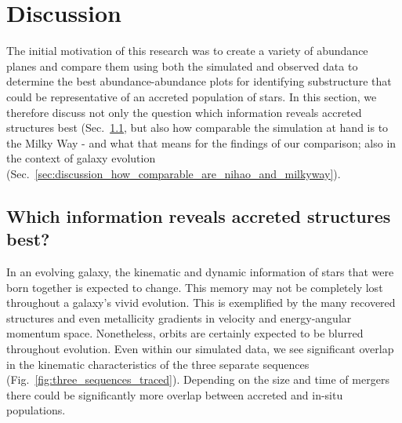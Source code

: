 \documentclass[fleqn,usenatbib]{mnras}
\begin{document}
\section{Discussion} \label{sec:discussion}

The initial motivation of this research was to create a variety of abundance planes and compare them using both the simulated and observed data to determine the best abundance-abundance plots for identifying substructure that could be representative of an accreted population of stars. In this section, we therefore discuss not only the question which information reveals accreted structures best (Sec.~\ref{sec:discussion_best_information}, but also how comparable the simulation at hand is to the Milky Way - and what that means for the findings of our comparison; also in the context of galaxy evolution (Sec.~\ref{sec:discussion_how_comparable_are_nihao_and_milkyway}).

\subsection{Which information reveals accreted structures best?} \label{sec:discussion_best_information}

In an evolving galaxy, the kinematic and dynamic information of stars that were born together is expected to change. This memory may not be completely lost throughout a galaxy's vivid evolution. This is exemplified by the many recovered structures \citep{Deason2024} and even metallicity gradients \cite{Khoperskov2023d} in velocity and energy-angular momentum space. Nonetheless, orbits are certainly expected to be blurred throughout evolution. Even within our simulated data, we see significant overlap in the kinematic characteristics of the three separate sequences (Fig.~\ref{fig:three_sequences_traced}). Depending on the size and time of mergers there could be significantly more overlap between accreted and in-situ populations.
\end{document}
